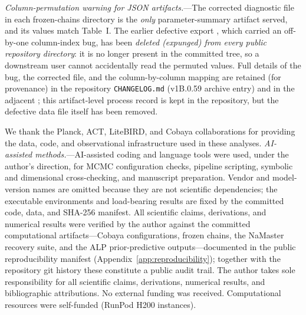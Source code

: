 \documentclass[aps,prd,twocolumn,superscriptaddress,showpacs,preprintnumbers,nofootinbib,longbibliography,floatfix]{revtex4-2}
\begin{document}
\emph{Column-permutation warning for JSON artifacts.}---The corrected
diagnostic file  in each
frozen-chains directory is the \emph{only} parameter-summary artifact
served, and its values match Table~I. The earlier defective export
, which carried an off-by-one
column-index bug, has been \emph{deleted (expunged) from every public
repository directory}: it is no longer present in the committed tree,
so a downstream user cannot accidentally read the permuted values. Full
details of the bug, the corrected file, and the column-by-column mapping
are retained (for provenance) in the repository \texttt{CHANGELOG.md}
(v1B.0.59 archive entry) and in the adjacent
; this artifact-level
process record is kept in the repository, but the defective data file
itself has been removed.


\begin{acknowledgments}
We thank the Planck, ACT, LiteBIRD, and Cobaya collaborations for providing
the data, code, and observational infrastructure used in these analyses.
\emph{AI-assisted methods.}---AI-assisted coding and language tools were used,
under the author's direction, for MCMC configuration checks, pipeline scripting,
symbolic and dimensional cross-checking, and manuscript preparation. Vendor and
model-version names are omitted because they are not scientific dependencies;
the executable environments and load-bearing results are fixed by the committed
code, data, and SHA-256 manifest.
All scientific claims, derivations, and numerical results were verified by the
author against the committed computational artifacts---Cobaya configurations,
frozen chains, the NaMaster recovery suite, and the ALP prior-predictive
outputs---documented in the public reproducibility manifest
(Appendix~\ref{app:reproducibility}); together with the repository git history
these constitute a public audit trail. The author takes sole responsibility for
all scientific claims, derivations, numerical results, and bibliographic
attributions. No external funding was received. Computational resources
were self-funded (RunPod H200 instances).
\end{acknowledgments}


\appendix
\end{document}
